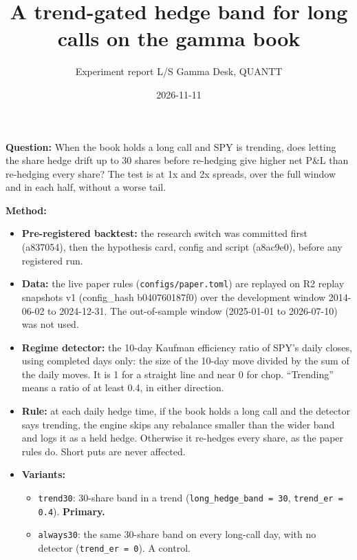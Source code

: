 \documentclass{article}
\title{A trend-gated hedge band for long calls on the gamma book}
\author{Experiment report \textperiodcentered{} L/S Gamma Desk, QUANTT}
\date{2026-11-11}
\begin{document}
\maketitle

\textbf{Question:} When the book holds a long call and SPY is trending, does letting the share hedge drift up to 30 shares before re-hedging give higher net P\&L than re-hedging every share? The test is at 1x and 2x spreads, over the full window and in each half, without a worse tail.

\textbf{Method:}

\begin{itemize}

\item \textbf{Pre-registered backtest:} the research switch was committed first (a837054), then the hypothesis card, config and script (a8ac9e0), before any registered run.

\item \textbf{Data:} the live paper rules (\texttt{configs/\allowbreak{}paper.\allowbreak{}toml}) are replayed on R2 replay snapshots v1 (config\_hash b040760187f0) over the development window 2014-06-02 to 2024-12-31. The out-of-sample window (2025-01-01 to 2026-07-10) was not used.

\item \textbf{Regime detector:} the 10-day Kaufman efficiency ratio of SPY's daily closes, using completed days only: the size of the 10-day move divided by the sum of the daily moves. It is 1 for a straight line and near 0 for chop. ``Trending'' means a ratio of at least 0.4, in either direction.

\item \textbf{Rule:} at each daily hedge time, if the book holds a long call and the detector says trending, the engine skips any rebalance smaller than the wider band and logs it as a held hedge. Otherwise it re-hedges every share, as the paper rules do. Short puts are never affected.

\item \textbf{Variants:}

\begin{itemize}

\item \texttt{trend30}: 30-share band in a trend (\texttt{long\_\allowbreak{}hedge\_\allowbreak{}band = 30}, \texttt{trend\_\allowbreak{}er = 0.\allowbreak{}4}). \textbf{Primary.}

\item \texttt{always30}: the same 30-share band on every long-call day, with no detector (\texttt{trend\_\allowbreak{}er = 0}). A control.


\end{itemize}
\end{itemize}
\end{document}
